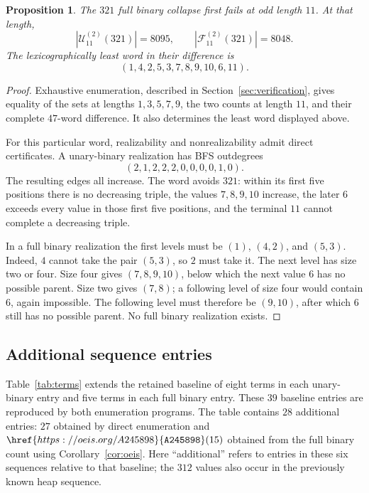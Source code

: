 \documentclass[11pt]{article}
\newtheorem{proposition}[theorem]{Proposition}
\theoremstyle{definition}
\newcommand{\UB}{\mathcal U}
\newcommand{\FB}{\mathcal F}
\newcommand{\seq}[1]{\href{https://oeis.org/#1}{\texttt{#1}}}
\begin{document}
\begin{proposition}\label{prop:parityfailure}
The $321$ full binary collapse first fails at odd length $11$. At that length,
\[
|\UB_{11}^{(2)}(321)|=8095,\qquad |\FB_{11}^{(2)}(321)|=8048.
\]
The lexicographically least word in their difference is
\[
(1,4,2,5,3,7,8,9,10,6,11).
\]
\end{proposition}
\begin{proof}
Exhaustive enumeration, described in Section~\ref{sec:verification}, gives equality of the sets at lengths $1,3,5,7,9$, the two counts at length $11$, and their complete $47$-word difference. It also determines the least word displayed above.

For this particular word, realizability and nonrealizability admit direct certificates. A unary-binary realization has BFS outdegrees
\[
(2,1,2,2,2,0,0,0,0,1,0).
\]
The resulting edges all increase. The word avoids $321$: within its first five positions there is no decreasing triple, the values $7,8,9,10$ increase, the later $6$ exceeds every value in those first five positions, and the terminal $11$ cannot complete a decreasing triple.

In a full binary realization the first levels must be $(1)$, $(4,2)$, and $(5,3)$. Indeed, $4$ cannot take the pair $(5,3)$, so $2$ must take it. The next level has size two or four. Size four gives $(7,8,9,10)$, below which the next value $6$ has no possible parent. Size two gives $(7,8)$; a following level of size four would contain $6$, again impossible. The following level must therefore be $(9,10)$, after which $6$ still has no possible parent. No full binary realization exists.
\end{proof}

\subsection{Additional sequence entries}

Table~\ref{tab:terms} extends the retained baseline of eight terms in each unary-binary entry and five terms in each full binary entry. These $39$ baseline entries are reproduced by both enumeration programs. The table contains $28$ additional entries: $27$ obtained by direct enumeration and $\seq{A245898}(15)$ obtained from the full binary count using Corollary~\ref{cor:oeis}. Here ``additional'' refers to entries in these six sequences relative to that baseline; the $312$ values also occur in the previously known heap sequence.
\end{document}
